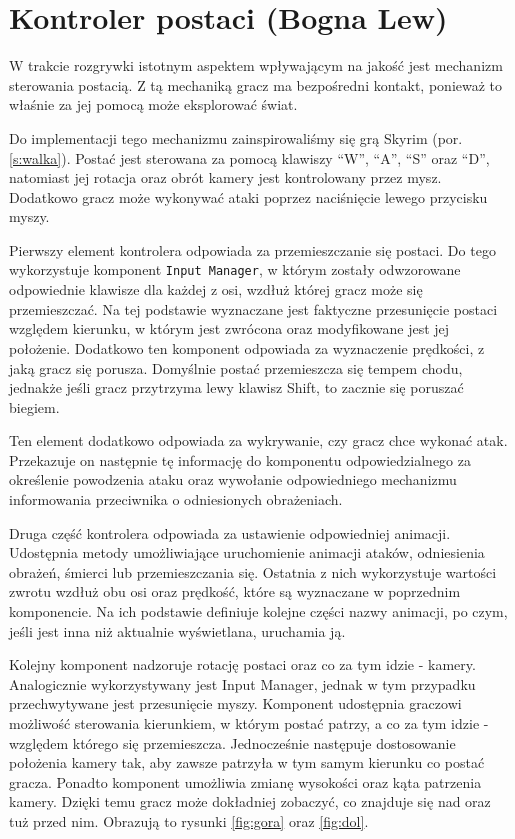 \section{Kontroler postaci (Bogna Lew)}\label{s:por_impl}
W trakcie rozgrywki istotnym aspektem wpływającym na jakość jest mechanizm sterowania postacią. Z tą mechaniką gracz ma
bezpośredni kontakt, ponieważ to właśnie za jej pomocą może eksplorować świat.

Do implementacji tego mechanizmu zainspirowaliśmy się grą Skyrim (por. \ref{s:walka}). Postać jest sterowana za pomocą klawiszy “W”, “A”, “S”
oraz “D”, natomiast jej rotacja oraz obrót kamery jest kontrolowany przez mysz. Dodatkowo gracz może wykonywać ataki
poprzez naciśnięcie lewego przycisku myszy.

Pierwszy element kontrolera odpowiada za przemieszczanie się postaci. Do tego wykorzystuje komponent \texttt{Input Manager}, w
którym zostały odwzorowane odpowiednie klawisze dla każdej z osi, wzdłuż której gracz może się przemieszczać. Na tej
podstawie wyznaczane jest faktyczne przesunięcie postaci względem kierunku, w którym jest zwrócona oraz modyfikowane
jest jej położenie. Dodatkowo ten komponent odpowiada za wyznaczenie prędkości, z jaką gracz się porusza. Domyślnie
postać przemieszcza się tempem chodu, jednakże jeśli gracz przytrzyma lewy klawisz Shift, to zacznie się poruszać biegiem.

Ten element dodatkowo odpowiada za wykrywanie, czy gracz chce wykonać atak. Przekazuje on następnie tę informację do
komponentu odpowiedzialnego za określenie powodzenia ataku oraz wywołanie odpowiedniego mechanizmu informowania
przeciwnika o odniesionych obrażeniach.

Druga część kontrolera odpowiada za ustawienie odpowiedniej animacji. Udostępnia metody umożliwiające uruchomienie
animacji ataków, odniesienia obrażeń, śmierci lub przemieszczania się. Ostatnia z nich wykorzystuje wartości zwrotu wzdłuż
obu osi oraz prędkość, które są wyznaczane w poprzednim komponencie. Na ich podstawie definiuje kolejne części nazwy
animacji, po czym, jeśli jest inna niż aktualnie wyświetlana, uruchamia ją.

Kolejny komponent nadzoruje rotację postaci oraz co za tym idzie - kamery. Analogicznie wykorzystywany jest Input
Manager, jednak w tym przypadku przechwytywane jest przesunięcie myszy. Komponent udostępnia graczowi możliwość
sterowania kierunkiem, w którym postać patrzy, a co za tym idzie - względem którego się przemieszcza. Jednocześnie
następuje dostosowanie położenia kamery tak, aby zawsze patrzyła w tym samym kierunku co postać gracza. Ponadto
komponent umożliwia zmianę wysokości oraz kąta patrzenia kamery. Dzięki temu gracz może dokładniej zobaczyć,
co znajduje się nad oraz tuż przed nim. Obrazują to rysunki \ref{fig:gora} oraz \ref{fig:dol}.

